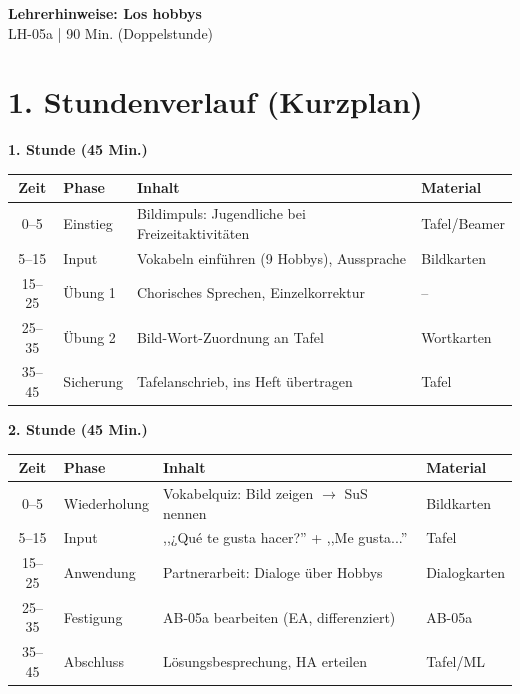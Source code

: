 \documentclass[11pt, a4paper]{article}
\newcommand{\fachfarbe}{spanisch}
\newcommand{\thema}{Los hobbys}
\newcommand{\sequenz}{05}
\newcommand{\block}{a}
\newcommand{\dauer}{90 Min. (Doppelstunde)}
\begin{document}

\begin{center}
    {\Large\bfseries\textcolor{\fachfarbe}{Lehrerhinweise: \thema}}\\[0.3em]
    {\normalsize LH-\sequenz\block{} | \dauer}
\end{center}

\vspace{10pt}


\section*{1. Stundenverlauf (Kurzplan)}

\textbf{1. Stunde (45 Min.)}

\begin{tabularx}{\textwidth}{|c|l|X|l|}
\hline
\textbf{Zeit} & \textbf{Phase} & \textbf{Inhalt} & \textbf{Material} \\
\hline
0--5 & Einstieg & Bildimpuls: Jugendliche bei Freizeitaktivitäten & Tafel/Beamer \\
\hline
5--15 & Input & Vokabeln einführen (9 Hobbys), Aussprache & Bildkarten \\
\hline
15--25 & Übung 1 & Chorisches Sprechen, Einzelkorrektur & -- \\
\hline
25--35 & Übung 2 & Bild-Wort-Zuordnung an Tafel & Wortkarten \\
\hline
35--45 & Sicherung & Tafelanschrieb, ins Heft übertragen & Tafel \\
\hline
\end{tabularx}

\vspace{1em}

\textbf{2. Stunde (45 Min.)}

\begin{tabularx}{\textwidth}{|c|l|X|l|}
\hline
\textbf{Zeit} & \textbf{Phase} & \textbf{Inhalt} & \textbf{Material} \\
\hline
0--5 & Wiederholung & Vokabelquiz: Bild zeigen $\rightarrow$ SuS nennen & Bildkarten \\
\hline
5--15 & Input & ,,¿Qué te gusta hacer?'' + ,,Me gusta...'' & Tafel \\
\hline
15--25 & Anwendung & Partnerarbeit: Dialoge über Hobbys & Dialogkarten \\
\hline
25--35 & Festigung & AB-05a bearbeiten (EA, differenziert) & AB-05a \\
\hline
35--45 & Abschluss & Lösungsbesprechung, HA erteilen & Tafel/ML \\
\hline
\end{tabularx}
\end{document}
